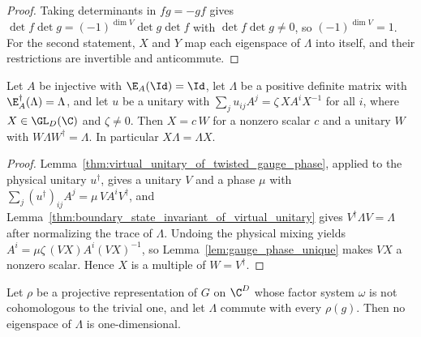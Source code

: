 \begin{proof}\leanok
    Taking determinants in $fg=-gf$ gives
    $\det f\det g=(-1)^{\dim V}\det g\det f$ with $\det f\det g\neq0$, so
    $(-1)^{\dim V}=1$.  For the second statement, $X$ and $Y$ map each eigenspace
    of $\Lambda$ into itself, and their restrictions are invertible and
    anticommute.
\end{proof}

\begin{lemma}
    \label{thm:virtual_gauge_fixes_boundary_state}
    \leanok
    Let $A$ be injective with $\E_A(\Id)=\Id$, let $\Lambda$ be a positive
    definite matrix with $\E_A^\dagger(\Lambda)=\Lambda$, and let $u$ be a
    unitary with
    $\sum_j u_{ij}A^j=\zeta\,XA^iX^{-1}$ for all $i$, where $X\in\GL_{D}(\C)$
    and $\zeta\neq0$.  Then $X=c\,W$ for a nonzero scalar $c$ and a unitary $W$
    with $W\Lambda W^\dagger=\Lambda$.  In particular $X\Lambda=\Lambda X$.
\end{lemma}

\begin{proof}\leanok
    Lemma~\ref{thm:virtual_unitary_of_twisted_gauge_phase}, applied to the
    physical unitary $u^\dagger$, gives a unitary $V$ and a phase $\mu$ with
    $\sum_j (u^\dagger)_{ij}A^j=\mu\,VA^iV^\dagger$, and
    Lemma~\ref{thm:boundary_state_invariant_of_virtual_unitary} gives
    $V^\dagger\Lambda V=\Lambda$ after normalizing the trace of $\Lambda$.
    Undoing the physical mixing yields $A^i=\mu\zeta\,(VX)A^i(VX)^{-1}$, so
    Lemma~\ref{lem:gauge_phase_unique} makes $VX$ a nonzero scalar.  Hence $X$
    is a multiple of $W=V^\dagger$.
\end{proof}

\begin{lemma}
    \label{lem:projective_commutant_eigenspace}
    \leanok
    Let $\rho$ be a projective representation of $G$ on $\C^D$ whose factor system
    $\omega$ is not cohomologous to the trivial one, and let $\Lambda$ commute with
    every $\rho(g)$.  Then no eigenspace of $\Lambda$ is one-dimensional.
\end{lemma}

